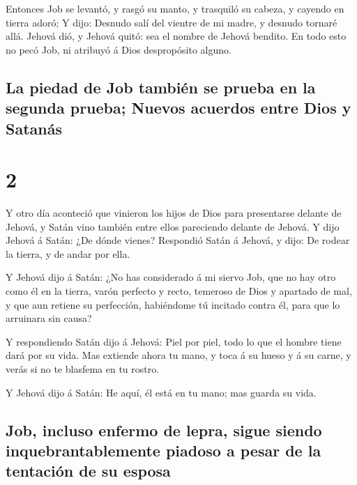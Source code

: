  Entonces Job se levantó, y rasgó su manto, y trasquiló su
cabeza, y cayendo en tierra adoró;  Y dijo: Desnudo salí
del vientre de mi madre, y desnudo tornaré allá. Jehová dió, y Jehová
quitó: sea el nombre de Jehová bendito.  En todo esto no
pecó Job, ni atribuyó á Dios despropósito alguno.

\hypertarget{la-piedad-de-job-tambiuxe9n-se-prueba-en-la-segunda-prueba-nuevos-acuerdos-entre-dios-y-satanuxe1s}{%
\subsection{La piedad de Job también se prueba en la segunda prueba;
Nuevos acuerdos entre Dios y
Satanás}\label{la-piedad-de-job-tambiuxe9n-se-prueba-en-la-segunda-prueba-nuevos-acuerdos-entre-dios-y-satanuxe1s}}

\hypertarget{section-1}{%
\section{2}\label{section-1}}

 Y otro día aconteció que vinieron los hijos de Dios para
presentarse delante de Jehová, y Satán vino también entre ellos
pareciendo delante de Jehová.  Y dijo Jehová á Satán: ¿De
dónde vienes? Respondió Satán á Jehová, y dijo: De rodear la tierra, y
de andar por ella.

 Y Jehová dijo á Satán: ¿No has considerado á mi siervo Job,
que no hay otro como él en la tierra, varón perfecto y recto, temeroso
de Dios y apartado de mal, y que aun retiene su perfección, habiéndome
tú incitado contra él, para que lo arruinara sin causa?

 Y respondiendo Satán dijo á Jehová: Piel por piel, todo lo
que el hombre tiene dará por su vida.  Mas extiende ahora tu
mano, y toca á su hueso y á su carne, y verás si no te blasfema en tu
rostro.

 Y Jehová dijo á Satán: He aquí, él está en tu mano; mas
guarda su vida.

\hypertarget{job-incluso-enfermo-de-lepra-sigue-siendo-inquebrantablemente-piadoso-a-pesar-de-la-tentaciuxf3n-de-su-esposa}{%
\subsection{Job, incluso enfermo de lepra, sigue siendo
inquebrantablemente piadoso a pesar de la tentación de su
esposa}\label{job-incluso-enfermo-de-lepra-sigue-siendo-inquebrantablemente-piadoso-a-pesar-de-la-tentaciuxf3n-de-su-esposa}}

